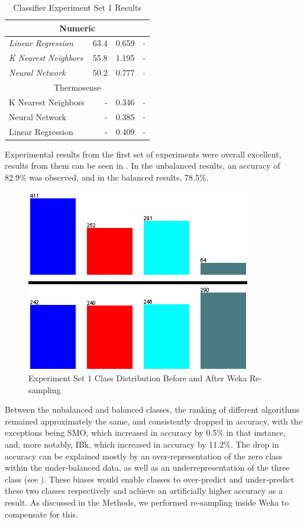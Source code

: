 \documentclass[../thesis/thesis.tex]{subfiles}
\begin{document}
\begin{table}
\begin{tabular}{|l|r|r|r|}
\multicolumn{4}{|c|}{Numeric} \\ \hline
\textit{Linear Regression}     & 63.4                        & 0.659  &  -          \\ \hline
\textit{K Nearest Neighbors}   & 55.8                        & 1.195  &  -          \\ \hline
\textit{Neural Network} 	   & 50.2                        & 0.777  &  -          \\ \hline

\multicolumn{4}{|c|}{Thermosense \cite{beltran2013thermosense}} \\ \hline
K Nearest Neighbors	    & - & 0.346 & - \\ \hline
Neural Network			& - & 0.385 & - \\ \hline		
Linear Regression		& - & 0.409 & - \\ \hline
\end{tabular}
\caption{Classifier Experiment Set 1 Results}
\label{tab:results:set1}
\end{table}

Experimental results from the first set of experiments were overall excellent, results from them can be seen in . In the unbalanced results, an accuracy of 82.9\% was observed, and in the balanced results, 78.5\%. 

\begin{figure}
\centering
\includegraphics{../diagrams/temp/resample.png}
\caption{Experiment Set 1 Class Distribution Before and After Weka Re-sampling}
\label{fig:results:resample}
\end{figure}

Between the unbalanced and balanced classes, the ranking of different algorithms remained approximately the same, and consistently dropped in accuracy, with the exceptions being SMO, which increased in accuracy by 0.5\% in that instance, and, more notably, IBk, which increased in accuracy by 11.2\%. The drop in accuracy can be explained mostly by an over-representation of the zero class within the under-balanced data, as well as an underrepresentation of the three class (see ). These biases would enable classes to over-predict and under-predict these two classes respectively and achieve an artificially higher accuracy as a result. As discussed in the Methods, we performed re-sampling inside Weka to compensate for this.
\end{document}
